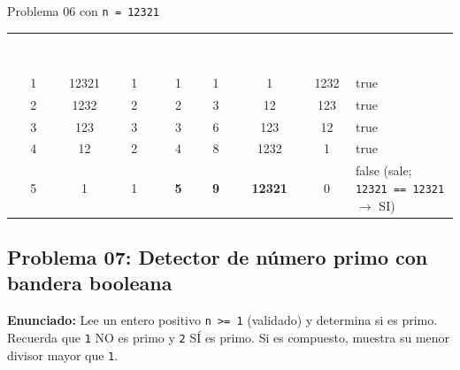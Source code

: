 \documentclass[11pt,letterpaper]{article}
\begin{document}




\begin{pruebaescritorio}{Problema 06 con \texttt{n = 12321}}
\begin{center}
\footnotesize
\setlength{\tabcolsep}{4pt}
\renewcommand{\arraystretch}{1.15}
\begin{tabularx}{\linewidth}{c c c c c c c X}
\rowcolor{AzulMarino}
\textcolor{white}{\textbf{Vuelta}} & \textcolor{white}{\texttt{aux} (ini)} & \textcolor{white}{\texttt{digito}} & \textcolor{white}{\texttt{cant}} & \textcolor{white}{\texttt{suma}} & \textcolor{white}{\texttt{invertido}} & \textcolor{white}{\texttt{aux} (fin)} & \textcolor{white}{\texttt{aux > 0}} \\
1 & 12321 & 1 & 1 & 1 & 1 & 1232 & true \\
2 & 1232 & 2 & 2 & 3 & 12 & 123 & true \\
3 & 123 & 3 & 3 & 6 & 123 & 12 & true \\
4 & 12 & 2 & 4 & 8 & 1232 & 1 & true \\
5 & 1 & 1 & \textbf{5} & \textbf{9} & \textbf{12321} & 0 & false (sale; \texttt{12321 == 12321} $\rightarrow$ SI) \\
\bottomrule
\end{tabularx}
\end{center}
\end{pruebaescritorio}

\subsection{Problema 07: Detector de número primo con bandera booleana}

\textbf{Enunciado:} Lee un entero positivo \texttt{n >= 1} (validado) y determina si es primo. Recuerda que \texttt{1} NO es primo y \texttt{2} SÍ es primo. Si es compuesto, muestra su menor divisor mayor que \texttt{1}.
\end{document}
